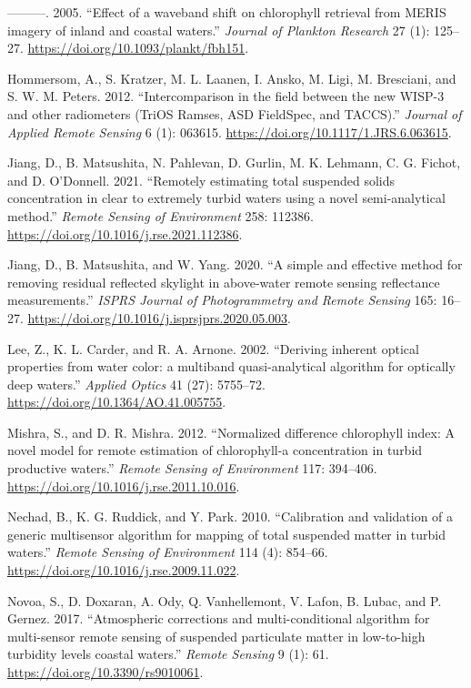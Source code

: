 \documentclass[
]{article}
\newlength{\cslhangindent}
\newenvironment{CSLReferences}[2] %
 {\begin{list}{}{%
  \setlength{\itemindent}{0pt}
  \setlength{\leftmargin}{0pt}
  \setlength{\parsep}{0pt}
  \ifodd #1
   \setlength{\leftmargin}{\cslhangindent}
   \setlength{\itemindent}{-1\cslhangindent}
  \fi
  \setlength{\itemsep}{#2\baselineskip}}}
 {\end{list}}
\begin{document}
\begin{CSLReferences}{1}{0}
---------. 2005. {``{Effect of a waveband shift on chlorophyll retrieval
from MERIS imagery of inland and coastal waters}.''} \emph{Journal of
Plankton Research} 27 (1): 125--27.
\url{https://doi.org/10.1093/plankt/fbh151}.

Hommersom, A., S. Kratzer, M. L. Laanen, I. Ansko, M. Ligi, M.
Bresciani, and S. W. M. Peters. 2012. {``{Intercomparison in the field
between the new WISP-3 and other radiometers (TriOS Ramses, ASD
FieldSpec, and TACCS)}.''} \emph{Journal of Applied Remote Sensing} 6
(1): 063615. \url{https://doi.org/10.1117/1.JRS.6.063615}.

Jiang, D., B. Matsushita, N. Pahlevan, D. Gurlin, M. K. Lehmann, C. G.
Fichot, and D. O'Donnell. 2021. {``{Remotely estimating total suspended
solids concentration in clear to extremely turbid waters using a novel
semi-analytical method}.''} \emph{Remote Sensing of Environment} 258:
112386. \url{https://doi.org/10.1016/j.rse.2021.112386}.

Jiang, D., B. Matsushita, and W. Yang. 2020. {``{A simple and effective
method for removing residual reflected skylight in above-water remote
sensing reflectance measurements}.''} \emph{ISPRS Journal of
Photogrammetry and Remote Sensing} 165: 16--27.
\url{https://doi.org/10.1016/j.isprsjprs.2020.05.003}.

Lee, Z., K. L. Carder, and R. A. Arnone. 2002. {``{Deriving inherent
optical properties from water color: a multiband quasi-analytical
algorithm for optically deep waters}.''} \emph{Applied Optics} 41 (27):
5755--72. \url{https://doi.org/10.1364/AO.41.005755}.

Mishra, S., and D. R. Mishra. 2012. {``{Normalized difference
chlorophyll index: A novel model for remote estimation of chlorophyll-a
concentration in turbid productive waters}.''} \emph{Remote Sensing of
Environment} 117: 394--406.
\url{https://doi.org/10.1016/j.rse.2011.10.016}.

Nechad, B., K. G. Ruddick, and Y. Park. 2010. {``{Calibration and
validation of a generic multisensor algorithm for mapping of total
suspended matter in turbid waters}.''} \emph{Remote Sensing of
Environment} 114 (4): 854--66.
\url{https://doi.org/10.1016/j.rse.2009.11.022}.

Novoa, S., D. Doxaran, A. Ody, Q. Vanhellemont, V. Lafon, B. Lubac, and
P. Gernez. 2017. {``{Atmospheric corrections and multi-conditional
algorithm for multi-sensor remote sensing of suspended particulate
matter in low-to-high turbidity levels coastal waters}.''} \emph{Remote
Sensing} 9 (1): 61. \url{https://doi.org/10.3390/rs9010061}.


\end{CSLReferences}
\end{document}
